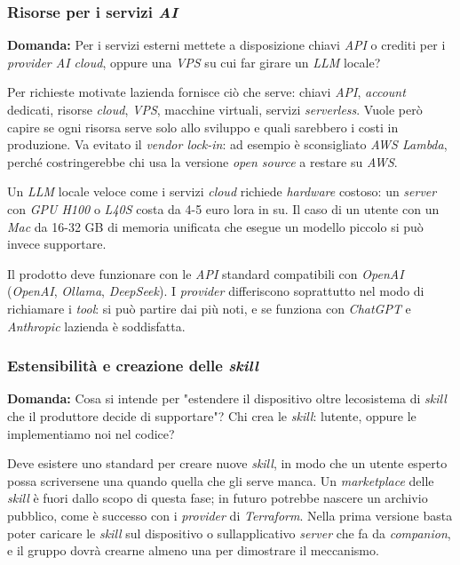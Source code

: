\documentclass[12pt,a4paper]{article}
\begin{document}
\hypertarget{risorse-per-i-servizi-ai}{%
\subsubsection{\texorpdfstring{Risorse per i servizi \emph{AI}}{Risorse per i servizi AI}}}

\textbf{Domanda:} Per i servizi esterni mettete a disposizione chiavi \emph{API} o crediti per i \emph{provider AI cloud}, oppure una \emph{VPS} su cui far girare un \emph{LLM} locale?

Per richieste motivate l\textquotesingle azienda fornisce ciò che serve: chiavi \emph{API}, \emph{account} dedicati, risorse \emph{cloud}, \emph{VPS}, macchine virtuali, servizi \emph{serverless}. Vuole però capire se ogni risorsa serve solo allo sviluppo e quali sarebbero i costi in produzione. Va evitato il \emph{vendor lock-in}: ad esempio è sconsigliato \emph{AWS Lambda}, perché costringerebbe chi usa la versione \emph{open source} a restare su \emph{AWS}.

Un \emph{LLM} locale veloce come i servizi \emph{cloud} richiede \emph{hardware} costoso: un \emph{server} con \emph{GPU H100} o \emph{L40S} costa da 4-5 euro l\textquotesingle ora in su. Il caso di un utente con un \emph{Mac} da 16-32 GB di memoria unificata che esegue un modello piccolo si può invece supportare.

Il prodotto deve funzionare con le \emph{API} standard compatibili con \emph{OpenAI} (\emph{OpenAI}, \emph{Ollama}, \emph{DeepSeek}). I \emph{provider} differiscono soprattutto nel modo di richiamare i \emph{tool}: si può partire dai più noti, e se funziona con \emph{ChatGPT} e \emph{Anthropic} l\textquotesingle azienda è soddisfatta.

\hypertarget{estensibilituxe0-e-creazione-delle-skill}{%
\subsubsection{\texorpdfstring{Estensibilità e creazione delle \emph{skill}}{Estensibilità e creazione delle skill}}}

\textbf{Domanda:} Cosa si intende per "estendere il dispositivo oltre l\textquotesingle ecosistema di \emph{skill} che il produttore decide di supportare"? Chi crea le \emph{skill}: l\textquotesingle utente, oppure le implementiamo noi nel codice?

Deve esistere uno standard per creare nuove \emph{skill}, in modo che un utente esperto possa scriversene una quando quella che gli serve manca. Un \emph{marketplace} delle \emph{skill} è fuori dallo scopo di questa fase; in futuro potrebbe nascere un archivio pubblico, come è successo con i \emph{provider} di \emph{Terraform}. Nella prima versione basta poter caricare le \emph{skill} sul dispositivo o sull\textquotesingle applicativo \emph{server} che fa da \emph{companion}, e il gruppo dovrà crearne almeno una per dimostrare il meccanismo.
\end{document}
